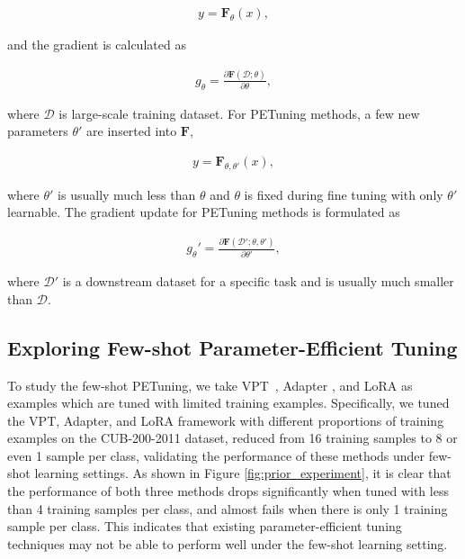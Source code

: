 \documentclass[10pt,journal,letterpaper,compsoc]{IEEEtran}
\begin{document}
\begin{equation}
\begin{aligned}
    y = \boldsymbol{F}_\theta(x),
\end{aligned}
\label{equ_01}
\end{equation}

\noindent and the gradient is calculated as

\begin{equation}
\begin{aligned}
    g_\theta = \frac{\partial \boldsymbol{F}(\mathcal{D}; \theta) }{\partial \theta},
\end{aligned}
\label{equ_02}
\end{equation}

\noindent where $\mathcal{D}$ is large-scale training dataset. For PETuning methods, a few new parameters $\theta'$ are inserted into $\boldsymbol{F}$,

\begin{equation}
\begin{aligned}
    y = \boldsymbol{F}_{\theta,\theta'}(x),
\end{aligned}
\label{equ_03}
\end{equation}

\noindent where $\theta'$ is usually much less than $\theta$ and $\theta$ is fixed during fine tuning with only $\theta'$ learnable. The gradient update for PETuning methods is formulated as 

\begin{equation}
\begin{aligned}
    g_\theta' = \frac{\partial \boldsymbol{F}(\mathcal{D'}; \theta, \theta') }{\partial \theta'},
\end{aligned}
\label{equ_04}
\end{equation}

\noindent where $\mathcal{D'}$ is a downstream dataset for a specific task and is usually much smaller than $\mathcal{D}$.

\subsection{Exploring Few-shot Parameter-Efficient Tuning}\label{section:sec3.2}
To study the few-shot PETuning, we take VPT~\cite{vpt}, Adapter \cite{adapter}, and LoRA \cite{Lora} as examples which are tuned with limited training examples. Specifically, we tuned the VPT, Adapter, and LoRA framework with different proportions of training examples on the CUB-200-2011 dataset, reduced from 16 training samples to 8 or even 1 sample per class, validating the performance of these methods under few-shot learning settings. As shown in Figure  \ref{fig:prior_experiment}, it is clear that the performance of both three methods drops significantly when tuned with less than 4 training samples per class, and almost fails when there is only 1 training sample per class. This indicates that existing parameter-efficient tuning techniques may not be able to perform well under the few-shot learning setting.
\end{document}
